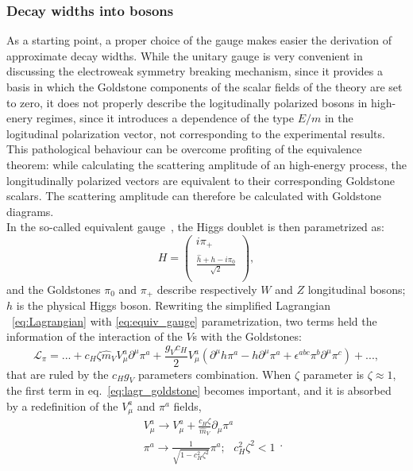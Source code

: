 \subsubsection{Decay widths into bosons}
\label{sec:HVT_decay_bosons}
As a starting point, a proper choice of the gauge makes easier the derivation of approximate decay widths. While the unitary gauge is very convenient in discussing the electroweak symmetry breaking mechanism, since it provides a basis in which the Goldstone components of the scalar fields of the theory are set to zero, it does not properly describe the logitudinally polarized bosons in high-enery regimes, since it introduces a dependence of the type $E/m$ in the logitudinal polarization vector, not corresponding to the experimental results. This pathological behaviour can be overcome profiting of the equivalence theorem: while calculating the scattering amplitude of an high-energy process, the longitudinally polarized vectors are equivalent to their corresponding Goldstone scalars. The scattering amplitude can therefore be calculated with Goldstone diagrams.\\
In the so-called equivalent gauge~\cite{Wulzer:2013mza}, the Higgs doublet is then parametrized as:
\begin{equation}
H =
\begin{pmatrix}
i \pi_+ \\
\frac{\hat{h} + h -i \pi_0}{\sqrt{2}} \\
\end{pmatrix}
,
\label{eq:equiv_gauge}
\end{equation}
and the Goldstones $\pi_0$ and $\pi_+$ describe respectively $W$ and $Z$ longitudinal bosons; $h$ is the physical Higgs boson. Rewriting the simplified Lagrangian ~\ref{eq:Lagrangian} with \ref{eq:equiv_gauge} parametrization, two terms held the information of the interaction of the $V$s with the Goldstones:
\begin{equation}
\mathcal{L}_{\pi} = ... + c_H \zeta {\hat{m}}_V V_{\mu}^a {\partial}^{\mu} {\pi}^a + \frac{g_V c_H}{2} V_{\mu}^a \left( {\partial}^{\mu} h {\pi}^a - h {\partial}^{\mu} {\pi}^a + {\epsilon}^{abc} \pi^b \partial^{\mu} \pi^c \right) + ...
,
\label{eq:lagr_goldstone}
\end{equation}
that are ruled by the $c_H g_V$ parameters combination. When $\zeta$ parameter is $\zeta \approx 1$, the first term in eq.~\ref{eq:lagr_goldstone} becomes important, and it is absorbed by a redefinition of the $V_{\mu}^a$ and $\pi^a$ fields,
\begin{equation}
\begin{split}
 & V_{\mu}^a \rightarrow V_{\mu}^a + \frac{c_H \zeta}{\hat{m}_V} \partial_{\mu} \pi^a\\
 & \pi^a \rightarrow \frac{1}{\sqrt{1 - c_H^2 \zeta^2}} \pi^a; \mbox{ } c_H^2 \zeta^2 < 1\\
\end{split}
.
\label{eq:field_redef}
\end{equation}
